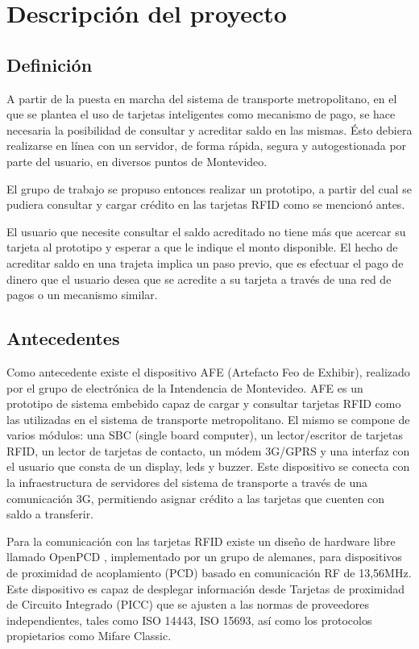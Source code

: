 \chapter{Descripci\'on del proyecto}

\section{Definici\'on}

A partir de la puesta en marcha del sistema de transporte metropolitano, en el que
se plantea el uso de tarjetas inteligentes como mecanismo de pago, se hace necesaria 
la posibilidad de consultar y acreditar saldo en las mismas. Ésto debiera realizarse en 
línea con un servidor, de forma rápida, segura y autogestionada por parte del usuario, 
en diversos puntos de Montevideo. 

El grupo de trabajo se propuso entonces realizar un prototipo, a partir del cual se 
pudiera consultar y cargar crédito en las tarjetas RFID como se mencionó antes. 

El usuario que necesite consultar el saldo acreditado no tiene más que acercar su 
tarjeta al prototipo y esperar a que le indique el monto disponible. El hecho de acreditar
saldo en una trajeta implica un paso previo, que es efectuar el pago de dinero que
el usuario desea que se acredite a su tarjeta a través de una red de pagos o un mecanismo 
similar. 

\section{Antecedentes}

Como antecedente existe el dispositivo AFE (Artefacto Feo de Exhibir), realizado por el 
grupo de electrónica de la Intendencia de Montevideo. AFE es un prototipo de sistema embebido 
capaz de cargar y consultar tarjetas RFID como las utilizadas en el sistema de transporte metropolitano. 
El mismo se compone de varios módulos: una SBC (single board computer), un lector/escritor 
de tarjetas RFID, un lector de tarjetas de contacto, un módem 3G/GPRS y una interfaz con el 
usuario que consta de un display, leds y buzzer. Este dispositivo se conecta con la infraestructura
de servidores del sistema de transporte a través de una comunicación 3G, permitiendo asignar
crédito a las tarjetas que cuenten con saldo a transferir. 

\bigskip
Para la comunicación con las tarjetas RFID existe un diseño de hardware libre llamado OpenPCD \cite{OpenPCD}, implementado por un grupo de alemanes, para dispositivos de proximidad de acoplamiento (PCD) basado en comunicación RF de 13,56MHz. Este dispositivo es capaz de desplegar información desde Tarjetas de proximidad de Circuito Integrado (PICC) que se ajusten a las normas de proveedores independientes, tales como ISO 14443, ISO 15693, así como los protocolos propietarios como Mifare Classic.